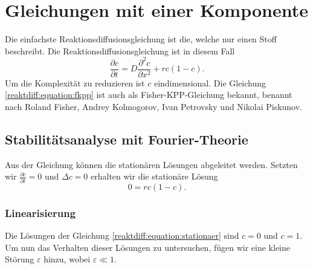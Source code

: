 %
%
%
%
\section{Gleichungen mit einer Komponente
\label{reaktdiff:section:einKomponent}}
%
Die einfachste Reaktionsdiffusionsgleichung ist die, welche nur einen Stoff beschreibt.
Die Reaktionsdiffusionsgleichung ist in diesem Fall
\begin{equation*}
\label{reaktdiff:equation:fkpp}
\frac{\partial c}{\partial t} = D \frac{\partial^2 c}{\partial x^2} + rc(1-c).
\end{equation*}
Um die Komplexität zu reduzieren ist \(c\) eindimensional. 
Die Gleichung \eqref{reaktdiff:equation:fkpp} ist auch als Fisher-KPP-Gleichung \cite{reaktdiff:wikipedia_kpp_fisher} bekannt, benannt nach Roland Fisher, Andrey Kolmogorov, Ivan Petrovsky und Nikolai Piskunov.
%
%
%
%
%

\subsection{Stabilitätsanalyse mit Fourier-Theorie
\label{reaktdiff:subsection:fkppmathe}}
Aus der Gleichung können die stationären Lösungen abgeleitet werden.
%
Setzten wir \(\frac{\partial c}{\partial t} = 0\) und \(\Delta c = 0\) erhalten wir die stationäre Lösung
\begin{equation}
\label{reaktdiff:equation:stationaer}
0 = rc(1-c).
\end{equation}

\subsubsection{Linearisierung}
%
Die Lösungen der Gleichung
\eqref{reaktdiff:equation:stationaer}
sind \(c = 0\) und \(c = 1\).
Um nun das Verhalten dieser Lösungen zu untersuchen, fügen wir eine kleine Störung \(\varepsilon\) hinzu, wobei \(\varepsilon \ll 1\).

